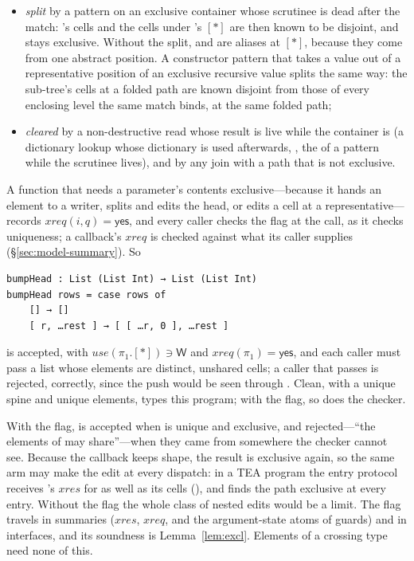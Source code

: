 \begin{itemize}
disjoint from the rest keeps it, a store of anything else clears it, and copying in the elements of a
list that lives on clears it;
\item \emph{split} by a pattern \code{[ x, …rest ]} on an exclusive container whose scrutinee is dead
after the match: 's cells and the cells under 's $[\ast]$ are then known to be
disjoint, and  stays exclusive. Without the split,  and  are aliases at
$[\ast]$, because they come from one abstract position. A constructor pattern that takes a value out of
a representative position of an exclusive recursive value splits the same way: the sub-tree's cells at a
folded path are known disjoint from those of every enclosing level the same match binds, at the same
folded path;
\item \emph{cleared} by a non-destructive read whose result is live while the container is (a dictionary
lookup whose dictionary is used afterwards, , the  of a pattern while the
scrutinee lives), and by any join with a path that is not exclusive.
\end{itemize}
A function that needs a parameter's contents exclusive---because it hands an element to a writer, splits
and edits the head, or edits a cell at a representative---records $\mathit{xreq}(i, q) = \mathsf{yes}$,
and every caller checks the flag at the call, as it checks uniqueness; a callback's $\mathit{xreq}$ is
checked against what its caller supplies (\S\ref{sec:model-summary}). So
\begin{Verbatim}
bumpHead : List (List Int) → List (List Int)
bumpHead rows = case rows of
    [] → []
    [ r, …rest ] → [ [ …r, 0 ], …rest ]
\end{Verbatim}
is accepted, with $\mathit{use}(\pi_1.[\ast]) \ni \mathsf{W}$ and $\mathit{xreq}(\pi_1) = \mathsf{yes}$,
and each caller must pass a list whose elements are distinct, unshared cells; a caller that passes
\code{[ r, r ]} is rejected, correctly, since the push would be seen through . Clean, with a
unique spine and unique elements, types this program; with the flag, so does the checker.

With the flag,  is accepted when
 is unique and exclusive, and rejected---``the elements of  may share''---when they
came from somewhere the checker cannot see. Because the callback keeps shape, the result is exclusive
again, so the same arm may make the edit at every dispatch: in a TEA program the entry protocol
receives 's $\mathit{xres}$ for  as well as its cells (), and finds
the path exclusive at every entry. Without the flag the whole class of nested edits would be a limit.
The flag travels in summaries ($\mathit{xres}$, $\mathit{xreq}$, and the argument-state atoms of guards)
and in interfaces, and its soundness is Lemma~\ref{lem:excl}. Elements of a crossing type need
none of this.
